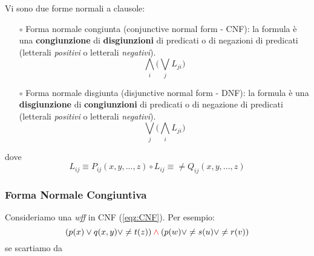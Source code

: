 \documentclass[11pt]{article}
\begin{document}
Vi sono due forme normali a clausole:
\begin{itemize}
	\item[$\circ$]\color{blue}Forma normale congiunta\color{black} (conjunctive normal form - CNF): la formula è una \textbf{congiunzione} di \textbf{disgiunzioni} di predicati o di negazioni di predicati (letterali \textit{positivi} o letterali \textit{negativi}).
	\begin{equation}
	\label{eqz:CNF}
	\bigwedge_i \bigg( \bigvee_j L_{ji} \bigg) 
	\end{equation}
	\item[$\circ$]\color{blue}Forma normale disgiunta\color{black} (disjunctive normal form - DNF): la formula è una \textbf{disgiunzione} di \textbf{congiunzioni} di predicati o di negazione di predicati (letterali \textit{positivi} o letterali \textit{negativi}).
	\begin{equation}
	\bigvee_j \bigg( \bigwedge_i L_{ji} \bigg) 
	\end{equation}
\end{itemize}
dove 
\begin{equation*}
	L_{ij} \equiv P_{ij} (x,y,...,z) \circ L_{ij} \equiv \neq Q_{ij}(x,y,...,z)
\end{equation*}

\subsubsection{Forma Normale Congiuntiva}
Consideriamo una \textit{wff} in CNF (\ref{eqz:CNF}). Per esempio:
\begin{equation}
\label{eqz:es1CNF}
(p(x) \vee q(x,y) \vee \neq t(z)) \color{red}\wedge\color{black} (p(w) \vee \neq s(u) \vee \neq r(v))
\end{equation}
se scartiamo da 
\end{document}
